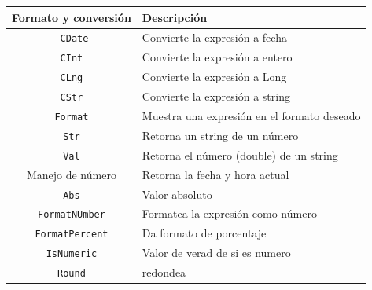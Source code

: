 \begin{table}[H]
    \centering
    \begin{tabular}{c|l}
       \rowcolor{micolor1} Formato y conversión & Descripción  \\ \hline
        \texttt{ CDate} & Convierte la expresión a fecha  \\
       \texttt{ CInt } & Convierte la expresión a entero \\
       \texttt{ CLng } & Convierte la expresión a Long \\
       \texttt{ CStr } & Convierte la expresión a string \\
       \texttt{ Format } & Muestra una expresión en el formato deseado \\
       \texttt{ Str } & Retorna un string de un número \\
       \texttt{ Val } &  Retorna el número (double) de un string\\
       \rowcolor{micolor1} Manejo de número & Retorna la fecha y hora actual \\
       \texttt{ Abs } & Valor absoluto \\
       \texttt{ FormatNUmber } & Formatea la expresión como número \\
       \texttt{ FormatPercent } & Da formato de porcentaje \\
       \texttt{ IsNumeric } & Valor de verad de si es numero\\
       \texttt{ Round } & redondea\\
    \end{tabular}
\end{table}

